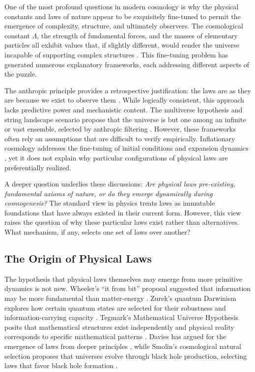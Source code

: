 \documentclass[12pt,a4paper]{article}
\theoremstyle{definition}
\theoremstyle{remark}
\begin{document}
One of the most profound questions in modern cosmology is why the physical constants and laws of nature appear to be exquisitely fine-tuned to permit the emergence of complexity, structure, and ultimately observers. The cosmological constant $\Lambda$, the strength of fundamental forces, and the masses of elementary particles all exhibit values that, if slightly different, would render the universe incapable of supporting complex structures \cite{rees1999just, carr2007universe}. This fine-tuning problem has generated numerous explanatory frameworks, each addressing different aspects of the puzzle.

The anthropic principle provides a retrospective justification: the laws are as they are because we exist to observe them \cite{barrow1986anthropic, carter1974large}. While logically consistent, this approach lacks predictive power and mechanistic content. The multiverse hypothesis and string landscape scenario propose that the universe is but one among an infinite or vast ensemble, selected by anthropic filtering \cite{weinberg1987anthropic, susskind2003landscape}. However, these frameworks often rely on assumptions that are difficult to verify empirically. Inflationary cosmology addresses the fine-tuning of initial conditions and expansion dynamics \cite{guth1981inflationary}, yet it does not explain why particular configurations of physical laws are preferentially realized.

A deeper question underlies these discussions: \emph{Are physical laws pre-existing, fundamental axioms of nature, or do they emerge dynamically during cosmogenesis?} The standard view in physics treats laws as immutable foundations that have always existed in their current form. However, this view raises the question of why these particular laws exist rather than alternatives. What mechanism, if any, selects one set of laws over another?

\subsection{The Origin of Physical Laws}

The hypothesis that physical laws themselves may emerge from more primitive dynamics is not new. Wheeler's ``it from bit'' proposal suggested that information may be more fundamental than matter-energy \cite{wheeler1990information}. Zurek's quantum Darwinism explores how certain quantum states are selected for their robustness and information-carrying capacity \cite{zurek2009quantum}. Tegmark's Mathematical Universe Hypothesis posits that mathematical structures exist independently and physical reality corresponds to specific mathematical patterns \cite{tegmark2014mathematical}. Davies has argued for the emergence of laws from deeper principles \cite{davies2007goldilocks}, while Smolin's cosmological natural selection proposes that universes evolve through black hole production, selecting laws that favor black hole formation \cite{smolin1997life}.
\end{document}
